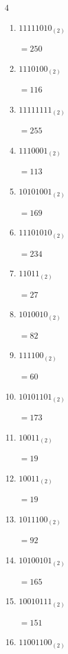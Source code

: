 \begin{multicols}{4}
\begin{enumerate}
        $=133$

  \item $11111010_{(2)}$

        $=250$

\columnbreak %

\resetques

  \item $1110100_{(2)}$

        $=116$

  \item $11111111_{(2)}$

        $=255$

  \item $1110001_{(2)}$

        $=113$

  \item $10101001_{(2)}$

        $=169$

  \item $11101010_{(2)}$

        $=234$

  \item $11011_{(2)}$

        $=27$

  \item $1010010_{(2)}$

        $=82$

  \item $111100_{(2)}$

        $=60$

  \item $10101101_{(2)}$

        $=173$

  \item $10011_{(2)}$

        $=19$

  \item $10011_{(2)}$

        $=19$

  \item $1011100_{(2)}$

        $=92$

  \item $10100101_{(2)}$

        $=165$

  \item $10010111_{(2)}$

        $=151$

  \item $11001100_{(2)}$


\end{enumerate}
\end{multicols}
